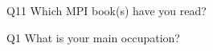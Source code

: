 \begin{description}%
\item{Q11} Which MPI book(s) have you read?%
\item{Q1} What is your main occupation?%
\end{description}%
